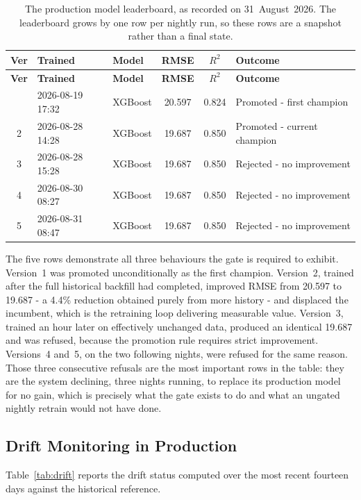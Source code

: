 \begin{xltabular}{\textwidth}{C P{3.0cm} P{2.0cm} C C Y}
\caption{The production model leaderboard, as recorded on 31~August~2026. The
leaderboard grows by one row per nightly run, so these rows are a snapshot rather
than a final state.}\label{tab:leaderboard}\\
\toprule
\bfseries Ver & \bfseries Trained & \bfseries Model & \bfseries RMSE &
\bfseries $R^2$ & \bfseries Outcome \\
\midrule
\endfirsthead
\toprule
\bfseries Ver & \bfseries Trained & \bfseries Model & \bfseries RMSE &
\bfseries $R^2$ & \bfseries Outcome \\
\midrule
\endhead
\bottomrule
{} & 2026-08-19 17:32 & XGBoost & 20.597 & 0.824 & Promoted - first champion \\
2 & 2026-08-28 14:28 & XGBoost & 19.687 & 0.850 & Promoted - current champion \\
3 & 2026-08-28 15:28 & XGBoost & 19.687 & 0.850 & Rejected - no improvement \\
4 & 2026-08-30 08:27 & XGBoost & 19.687 & 0.850 & Rejected - no improvement \\
5 & 2026-08-31 08:47 & XGBoost & 19.687 & 0.850 & Rejected - no improvement \\
\end{xltabular}

The five rows demonstrate all three behaviours the gate is required to exhibit.
Version~1 was promoted unconditionally as the first champion. Version~2, trained
after the full historical backfill had completed, improved RMSE from 20.597 to
19.687 - a 4.4\% reduction obtained purely from more history - and displaced the
incumbent, which is the retraining loop delivering measurable value. Version~3,
trained an hour later on effectively unchanged data, produced an identical 19.687
and was refused, because the promotion rule requires strict improvement.
Versions~4 and~5, on the two following nights, were refused for the same reason.
Those three consecutive refusals are the most important rows in the table: they
are the system declining, three nights running, to replace its production model
for no gain, which is precisely what the gate exists to do and what an ungated
nightly retrain would not have done.

\subsection{Drift Monitoring in Production}
Table~\ref{tab:drift} reports the drift status computed over the most recent
fourteen days against the historical reference.

